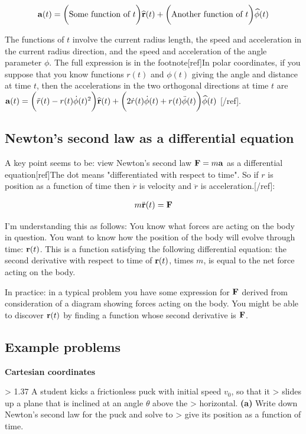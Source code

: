 \begin{align*}
\mathbf{a}(t) = \bigg( \text{Some function of } t \bigg) \mathbf{\widehat{r}}(t) + \bigg( \text{Another function of } t \bigg) \mathbf{\widehat{\phi}}(t)
\end{align*}

The functions of $t$ involve the current radius length, the speed and
acceleration in the current radius direction, and the speed and acceleration of
the angle parameter $\phi$. The full expression is in the footnote[ref]In polar
coordinates, if you suppose that you know functions $r(t)$ and $\phi(t)$ giving
the angle and distance at time $t$, then the accelerations in the two
orthogonal directions at time $t$ are
$\mathbf{a}(t) = \bigg( \ddot r(t) - r(t) \dot\phi(t)^2 \bigg) \mathbf{\widehat{r}}(t) + \bigg( 2\dot r(t) \dot \phi(t) + r(t) \ddot \phi(t)\bigg) \mathbf{\widehat{\phi}}(t)$
[/ref].


\subsection{Newton's second law as a differential equation}

A key point seems to be: view Newton's second law $\mathbf{F} = m\mathbf{a}$ as a differential
equation[ref]The dot means "differentiated with respect to time". So if $r$ is
position as a function of time then $\dot r$ is velocity and $\ddot r$ is
acceleration.[/ref]:

\begin{align*}
m \ddot {\mathbf{r}}(t) = \mathbf{F}
\end{align*}

I'm understanding this as follows: You know what forces are acting on the body
in question. You want to know how the position of the body will evolve through
time: $\mathbf{r}(t)$. This is a function satisfying the following differential
equation: the second derivative with respect to time of $\mathbf{r}(t)$, times $m$, is
equal to the net force acting on the body.

In practice: in a typical problem you have some expression for $\mathbf{F}$ derived from
consideration of a diagram showing forces acting on the body. You might be able
to discover $\mathbf{r}(t)$ by finding a function whose second derivative is $\mathbf{F}$.

\subsection{Example problems}

\textbf{Cartesian coordinates}

> 1.37 A student kicks a frictionless puck with initial speed $v_0$, so that it
> slides up a plane that is inclined at an angle $\theta$ above the
> horizontal. \textbf{(a)} Write down Newton's second law for the puck and solve to
> give its position as a function of time.

